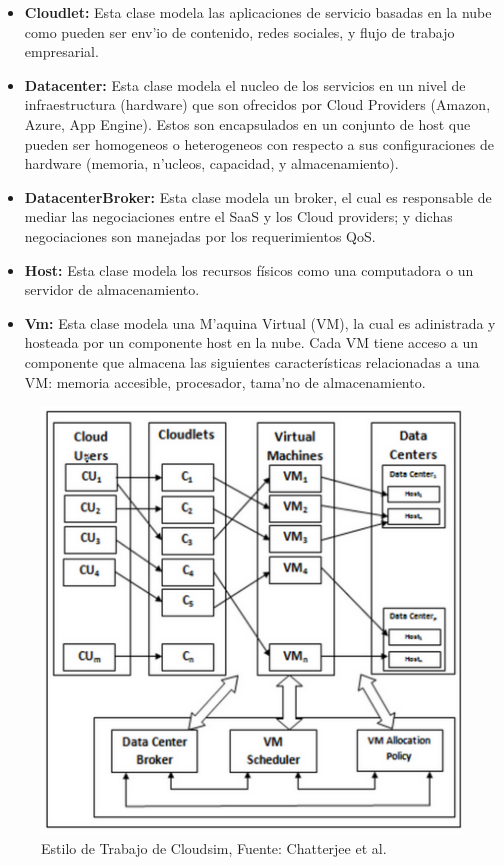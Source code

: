 \begin{itemize}
	\item  \textbf{Cloudlet:} Esta clase modela las aplicaciones de servicio basadas en la nube como pueden ser env'io de contenido, redes sociales, y flujo de trabajo empresarial.
	\item  \textbf{Datacenter:} Esta clase modela el nucleo de los servicios en un nivel de infraestructura (hardware) que son ofrecidos por Cloud Providers (Amazon, Azure, App Engine). Estos son encapsulados en un conjunto de host que pueden ser homogeneos o heterogeneos con respecto a sus configuraciones de hardware (memoria, n'ucleos, capacidad, y almacenamiento).
	\item  \textbf{DatacenterBroker:} Esta clase modela un broker, el cual es responsable de mediar las negociaciones entre el SaaS y los Cloud providers; y dichas negociaciones son manejadas por los requerimientos QoS.
	\item  \textbf{Host:} Esta clase modela los recursos físicos como una computadora o un servidor de almacenamiento.
	\item  \textbf{Vm:} Esta clase modela una M'aquina Virtual (VM), la cual es adinistrada y hosteada por un componente host en la nube. Cada VM tiene acceso a un componente que almacena las siguientes características relacionadas a una VM: memoria accesible, procesador, tama'no de almacenamiento.
\end{itemize}


\begin{figure}
	\caption{Estilo de Trabajo de Cloudsim, Fuente: Chatterjee et al.}
	\centering
	\includegraphics[scale=0.5]{media/imagenuno}
\end{figure}


